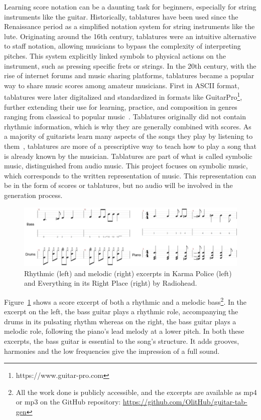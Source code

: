 Learning score notation can be a daunting task for beginners, especially for string instruments like the guitar.
Historically, tablatures have been used since the Renaissance period as a simplified notation system for string instruments like the lute.
Originating around the 16th century, tablatures were an intuitive alternative to staff notation, allowing musicians to bypass the complexity of interpreting pitches.
This system explicitly linked symbols to physical actions on the instrument, such as pressing specific frets or strings.
In the 20th century, with the rise of internet forums and music sharing platforms, tablatures became a popular way to share music scores among amateur musicians.
First in ASCII format, tablatures were later digitalized and standardized in formats like GuitarPro\footnote{https://www.guitar-pro.com}, further extending their use for learning, practice, and composition in genres ranging from classical to popular music~\cite{sarmento_dadagp_2021}.
Tablatures originally did not contain rhythmic information, which is why they are generally combined with scores.
As a majority of guitarists learn many aspects of the songs they play by listening to them~\cite{green_how_2001},
tablatures are more of a prescriptive way to teach how to play a song that is already known by the musician.
Tablatures are part of what is called symbolic music, distinguished from audio music.
This project focuses on symbolic music, which corresponds to the written representation of music.
This representation can be in the form of scores or tablatures, but no audio will be involved in the generation process.


\begin{figure}[!ht]
    \includegraphics[width=.9\linewidth]{../images-figures/rhythmic_melodic.png}
    \caption{Rhythmic (left) and melodic (right) excerpts in Karma Police (left) and Everything in its Right Place (right) by Radiohead.}
    \label{fig:bass_tab_TIRO}
\end{figure}


Figure~\ref{fig:bass_tab_TIRO} shows a score excerpt of both a rhythmic and a melodic bass\footnote{All the work done is publicly accessible, and the excerpts are available as mp4 or mp3 on the GitHub repository: \url{https://github.com/OlitHub/guitar-tab-gen}}.
In the excerpt on the left, the bass guitar plays a rhythmic role, accompanying the drums in its pulsating rhythm 
whereas on the right, the bass guitar plays a melodic role, following the piano's lead melody at a lower pitch.
In both these excerpts, the bass guitar is essential to the song's structure.
It adds grooves, harmonies and the low frequencies give the impression of a full sound.

